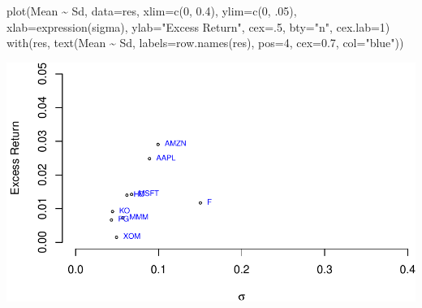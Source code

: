 \documentclass[
]{article}
\newenvironment{Shaded}{\begin{snugshade}}{\end{snugshade}}
\newcommand{\AttributeTok}[1]{\textcolor[rgb]{0.77,0.63,0.00}{#1}}
\newcommand{\DecValTok}[1]{\textcolor[rgb]{0.00,0.00,0.81}{#1}}
\newcommand{\FloatTok}[1]{\textcolor[rgb]{0.00,0.00,0.81}{#1}}
\newcommand{\FunctionTok}[1]{\textcolor[rgb]{0.00,0.00,0.00}{#1}}
\newcommand{\NormalTok}[1]{#1}
\newcommand{\SpecialCharTok}[1]{\textcolor[rgb]{0.00,0.00,0.00}{#1}}
\newcommand{\StringTok}[1]{\textcolor[rgb]{0.31,0.60,0.02}{#1}}
\begin{document}
\begin{Shaded}
\begin{Highlighting}[]
\FunctionTok{plot}\NormalTok{(Mean }\SpecialCharTok{\textasciitilde{}}\NormalTok{ Sd, }\AttributeTok{data=}\NormalTok{res, }\AttributeTok{xlim=}\FunctionTok{c}\NormalTok{(}\DecValTok{0}\NormalTok{, }\FloatTok{0.4}\NormalTok{), }\AttributeTok{ylim=}\FunctionTok{c}\NormalTok{(}\DecValTok{0}\NormalTok{, .}\DecValTok{05}\NormalTok{), }\AttributeTok{xlab=}\FunctionTok{expression}\NormalTok{(sigma),}
     \AttributeTok{ylab=}\StringTok{"Excess Return"}\NormalTok{, }\AttributeTok{cex=}\NormalTok{.}\DecValTok{5}\NormalTok{, }\AttributeTok{bty=}\StringTok{"n"}\NormalTok{, }\AttributeTok{cex.lab=}\DecValTok{1}\NormalTok{)}
\FunctionTok{with}\NormalTok{(res, }\FunctionTok{text}\NormalTok{(Mean }\SpecialCharTok{\textasciitilde{}}\NormalTok{ Sd, }\AttributeTok{labels=}\FunctionTok{row.names}\NormalTok{(res), }\AttributeTok{pos=}\DecValTok{4}\NormalTok{, }\AttributeTok{cex=}\FloatTok{0.7}\NormalTok{, }\AttributeTok{col=}\StringTok{"blue"}\NormalTok{))}
\end{Highlighting}
\end{Shaded}

\includegraphics{TP-Treynor_files/figure-latex/unnamed-chunk-13-1.pdf}
\end{document}
